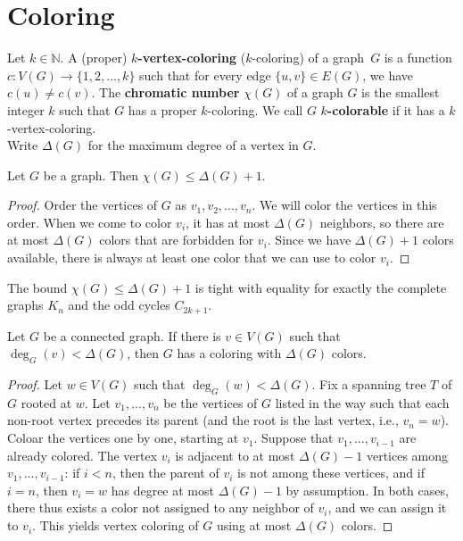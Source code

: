 \section{Coloring}
\begin{definition}\label{5.1}
    Let $k\in \mathbb{N}$. A (proper) \textbf{$k$-vertex-coloring} ($k$-coloring) of a graph~$G$ is a function $c: V(G) \to \{1, 2, \dots, k\}$ such that for every edge $\{u,v\} \in E(G)$, we have $c(u) \neq c(v)$. The \textbf{chromatic number} $\chi(G)$ of a graph $G$ is the smallest integer $k$ such that $G$ has a proper $k$-coloring. We call $G$ \textbf{$k$-colorable} if it has a $k$-vertex-coloring. \\
    Write $\Delta(G)$ for the maximum degree of a vertex in $G$.
\end{definition}
\begin{lemma}\label{5.2}
    Let $G$ be a graph. Then $\chi(G) \leq \Delta(G) + 1$.
\end{lemma}
\begin{proof}
    Order the vertices of $G$ as $v_1, v_2, \dots, v_n$. We will color the vertices in this order. When we come to color $v_i$, it has at most $\Delta(G)$ neighbors, so there are at most $\Delta(G)$ colors that are forbidden for $v_i$. Since we have $\Delta(G) + 1$ colors available, there is always at least one color that we can use to color $v_i$.
\end{proof}
\begin{remark}\label{5.3}
    The bound $\chi(G) \leq \Delta(G) + 1$ is tight with equality for exactly the complete graphs $K_n$ and the odd cycles $C_{2k+1}$. 
\end{remark}
\begin{lemma}\label{5.4}
    Let $G$ be a connected graph. If there is $v\in V(G)$ such that $\deg_G(v) < \Delta(G)$, then $G$ has a coloring with $\Delta(G)$ colors.
\end{lemma}
\begin{proof}
Let $w \in V(G)$ such that $\operatorname{deg}_G(w) < \Delta(G)$.
	Fix a spanning tree $T$ of $G$ rooted at $w$.
	Let $v_1, \dots, v_n$ be the vertices of $G$ listed in the way such that each non-root vertex precedes its parent (and the root is the last vertex, i.e., $v_n = w$). 
	Coloar the vertices one by one, starting at $v_1$. 
	Suppose that $v_1, \dots, v_{i-1}$ are already colored. 
	The vertex $v_i$ is adjacent to at most $\Delta(G)-1$ vertices among $v_1, \dots, v_{i-1}$: if $i <n$, then the parent of $v_i$ is not among these vertices, and if $i = n$, then $v_i = w$ has degree at most $\Delta(G)-1$ by assumption. 
	In both cases, there thus exists a color not assigned to any neighbor of $v_i$, and we can assign it to $v_i$. 
	This yields vertex coloring of $G$ using at most $\Delta(G)$ colors.
\end{proof}
